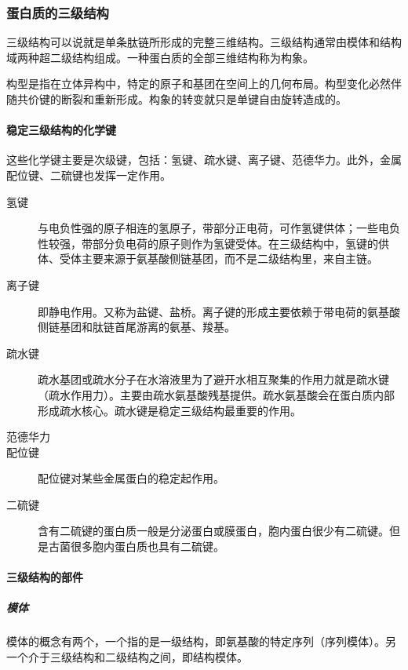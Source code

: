 \subsubsection{蛋白质的三级结构}

三级结构可以说就是单条肽链所形成的完整三维结构。三级结构通常由模体和结构域两种超二级结构组成。一种蛋白质的全部三维结构称为构象。

\begin{tx}[：区分“构象”与“构型”]
	构型是指在立体异构中，特定的原子和基团在空间上的几何布局。构型变化必然伴随共价键的断裂和重新形成。构象的转变就只是单键自由旋转造成的。
\end{tx}

\paragraph{稳定三级结构的化学键}

这些化学键主要是次级键，包括：氢键、疏水键、离子键、范德华力。此外，金属配位键、二硫键也发挥一定作用。

\begin{description}
	\item[氢键] 与电负性强的原子相连的氢原子，带部分正电荷，可作氢键供体；一些电负性较强，带部分负电荷的原子则作为氢键受体。在三级结构中，氢键的供体、受体主要来源于氨基酸侧链基团，而不是二级结构里，来自主链。
	\item[离子键] 即静电作用。又称为盐键、盐桥。离子键的形成主要依赖于带电荷的氨基酸侧链基团和肽链首尾游离的氨基、羧基。
	\item[疏水键] 疏水基团或疏水分子在水溶液里为了避开水相互聚集的作用力就是疏水键（疏水作用力）。主要由疏水氨基酸残基提供。疏水氨基酸会在蛋白质内部形成疏水核心。疏水键是稳定三级结构最重要的作用。
	\item[范德华力]
	\item[配位键] 配位键对某些金属蛋白的稳定起作用。
	\item[二硫键] 含有二硫键的蛋白质一般是分泌蛋白或膜蛋白，胞内蛋白很少有二硫键。但是古菌很多胞内蛋白质也具有二硫键。
\end{description}

\paragraph{三级结构的部件}

\subparagraph{模体}

模体的概念有两个，一个指的是一级结构，即氨基酸的特定序列（序列模体）。另一个介于三级结构和二级结构之间，即结构模体。

